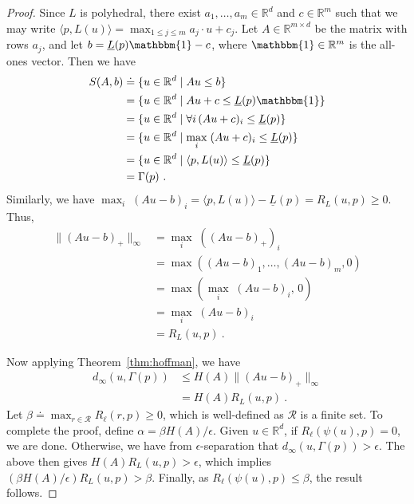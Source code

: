 \documentclass[12pt]{article}
\newcommand{\reals}{\mathbb{R}}
\newcommand{\defeq}{\doteq}%
\newcommand{\R}{\mathcal{R}}
\newcommand{\risk}[1]{\underline{#1}}
\newcommand{\inprod}[2]{\langle #1, #2 \rangle}%
\newcommand{\ones}{\mathbbm{1}}
\newcommand{\regret}[3]{R_{#1}(#2,#3)}
\begin{document}
\begin{proof}
  Since $L$ is polyhedral, there exist $a_1,\ldots,a_m \in \reals^d$ and $c\in\reals^m$ such that we may write $\inprod{p}{L(u)} = \max_{1\leq j\leq m} a_j \cdot u + c_j$.
  Let $A \in \reals^{m\times d}$ be the matrix with rows $a_j$, and let $b = \risk{L}(p)\ones - c$, where $\ones\in\reals^m$ is the all-ones vector.
  Then we have
  \begin{align*}
    S(A,b)
    &\defeq \{u\in\reals^d \mid A u \leq b\}
    \\
    &= \{u\in\reals^d \mid A u + c \leq \risk{L}(p)\ones\}
    \\
    &= \{u\in\reals^d \mid \forall i\, (A u + c)_i \leq \risk{L}(p)\}
    \\
    &= \{u\in\reals^d \mid \max_i \;(A u + c)_i \leq \risk{L}(p)\}
    \\
    &= \{u\in\reals^d \mid \inprod{p}{L(u)} \leq \risk{L}(p)\}
    \\
    & = \Gamma(p)~.
  \end{align*}
  Similarly, we have $\max_i\; (A u - b)_i = \inprod{p}{L(u)} - \risk{L}(p) = \regret{L}{u}{p} \geq 0$.
  Thus,
  \begin{align*}
    \|(Au - b)_+\|_\infty
    &= \max_i\; ((Au - b)_+)_i
    \\
    &= \max((Au - b)_1,\ldots,(Au - b)_m, 0)
    \\
    &= \max(\max_i\; (Au - b)_i, \, 0)
    \\
    &= \max_i\; (Au - b)_i
    \\
    &= \regret{L}{u}{p}~.
  \end{align*}

  Now applying Theorem~\ref{thm:hoffman}, we have
  \begin{align*}
    d_\infty(u,\Gamma(p))
    &\leq H(A) \|(Au-b)_+\|_\infty
    \\
    &= H(A) \regret{L}{u}{p}~.
  \end{align*}
  Let $\beta \defeq \max_{r\in\R} \regret{\ell}{r}{p}\geq 0$, which is well-defined as $\R$ is a finite set.
  To complete the proof, define $\alpha = \beta H(A)/\epsilon$.
  Given $u\in\reals^d$, if $\regret{\ell}{\psi(u)}{p} = 0$, we are done.
  Otherwise, we have from $\epsilon$-separation that $d_\infty(u,\Gamma(p)) > \epsilon$.
  The above then gives $H(A) \regret{L}{u}{p} > \epsilon$, which implies
  $(\beta H(A) / \epsilon) \regret{L}{u}{p} > \beta$.
  Finally, as $\regret{\ell}{\psi(u)}{p} \leq \beta$, the result follows.
\end{proof}
\end{document}
